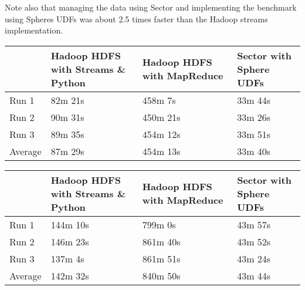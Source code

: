 \documentclass{acm_proc_article-sp}
\def\malstone{MalStone } \def\malgen{MalGen }
\begin{document}
Note also that managing the data using Sector and implementing the
benchmark using Spheres UDFs was about 2.5 times faster than the
Hadoop streams implementation.


\begin{table*}
\begin{center}
\begin{tabular}{|p{1.0in}|p{1.0in}|p{1.0in}|p{1.0in}|} \hline
& {\bf Hadoop HDFS with Streams \& Python} & 
{\bf Hadoop HDFS with MapReduce} & {\bf Sector with 
Sphere UDFs} \\ \hline
Run 1 & 
	82m 21s & 
	458m 7s & 
	33m 44s \\ \hline
Run 2 & 
	90m 31s & 
	450m 21s & 
	33m 26s \\ \hline
Run 3 & 
	89m 35s & 
	454m 12s & 
	33m 51s \\ \hline
Average	 & 
        87m 29s & 
	454m 13s & 
	33m 40s \\ \hline
\end{tabular}
\end{center}
\caption{This table summarizes an experimental study
running \malstone A on 20 nodes.  Each node had 500 million 100-byte
\malstone records.  The tests used version 0.18.3 of Hadoop
and version 1.20 of Sector.}
\label{table:malstoneA}
\end{table*}

\begin{table*}
\begin{center}
\begin{tabular}{|p{1.0in}|p{1.0in}|p{1.0in}|p{1.0in}|} \hline
& {\bf Hadoop HDFS with Streams \& Python} & 
{\bf Hadoop HDFS with MapReduce} & {\bf Sector with 
Sphere UDFs} \\ \hline
Run 1	& 
        144m 10s &
	799m 0s &
	43m 57s  \\ \hline
Run 2  &
	146m 23s  &
	861m 40s &
	43m 52s \\ \hline
Run 3 &
	137m 4s &
	861m 51s &
	43m 24s  \\ \hline
Average	 &
        142m 32s &
	840m 50s  &
	43m 44s   \\ \hline
\end{tabular}
\end{center}
\caption{This table summarizes running \malstone B on 20 nodes.
        Each node had 500 million 100-byte
        \malstone records.  The tests used version 0.18.3 of Hadoop
        and version 1.20 of Sector.}
\label{table:malstoneB}
\end{table*}
\end{document}
